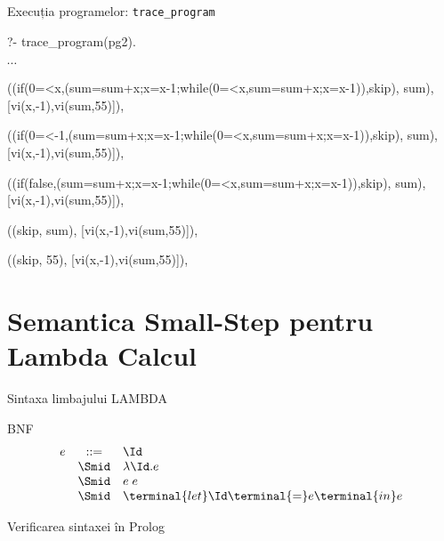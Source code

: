 \documentclass[xcolor=x11names,compress,10pt]{beamer}
\begin{document}
 \begin{frame}{Execuția programelor: \texttt{trace\_program}}

 \begin{example}
?- trace\_program(pg2).

$\cdots$\\
{\small
((if(0=<x,({sum=sum+x;x=x-1};while(0=<x,{sum=sum+x;x=x-1})),skip), sum),
[vi(x,-1),vi(sum,55)]),

((if(0=<-1,({sum=sum+x;x=x-1};while(0=<x,{sum=sum+x;x=x-1})),skip), sum),
[vi(x,-1),vi(sum,55)]),

((if(false,({sum=sum+x;x=x-1};while(0=<x,{sum=sum+x;x=x-1})),skip), sum),
[vi(x,-1),vi(sum,55)]),

((skip, sum),
[vi(x,-1),vi(sum,55)]),

((skip, 55),
[vi(x,-1),vi(sum,55)]),
}
 \end{example}
 
 \end{frame}

\section{Semantica Small-Step pentru Lambda Calcul}

  \begin{frame}[fragile]{Sintaxa limbajului LAMBDA}
    \begin{block}{BNF}
    \[
    \begin{array}{rcl}
      e & ::= & \Id \\
        & \Smid & \lambda \Id . e \\
        & \Smid & e\; e \\
        & \Smid & \terminal{let} \Id \terminal{=} e \terminal{in} e
    \end{array}
    \]
    \end{block}

    \begin{block}{Verificarea sintaxei în Prolog}
    \end{block}
 \end{frame}
\end{document}
